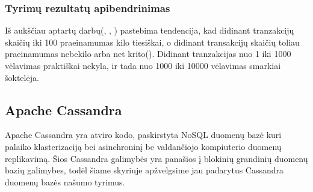\documentclass{VUMIFPSkursinis}
\begin{document}
		\subsubsection{Tyrimų rezultatų apibendrinimas}
			Iš aukščiau aptartų darbų(\cite{IMBResearch}, \cite{ThailandPerf}, \cite{ShaFabPerf}) pastebima tendencija, kad didinant tranzakcijų skaičių iki 100 praeinamumas kilo tiesiškai, o didinant transakcijų skaičių toliau praeinamumas nebekilo arba net krito(\cite{ThailandPerf}).
			\newline
			Didinant tranzakcijas nuo 1 iki 1000 vėlavimas praktiškai nekyla, ir tada nuo 1000 iki 10000 vėlavimas smarkiai šoktelėja. 
	\subsection{Apache Cassandra}
		Apache Cassandra yra atviro kodo, paskirstyta NoSQL duomenų bazė kuri palaiko klasterizaciją bei asinchroninį be valdančiojo kompiuterio duomenų replikavimą. Šios Cassandra galimybės yra panašios į blokinių grandinių duomenų bazių galimybes, todėl šiame skyriuje apžvelgsime jau padarytus 
		Cassandra duomenų bazės našumo tyrimus. 
\end{document}
